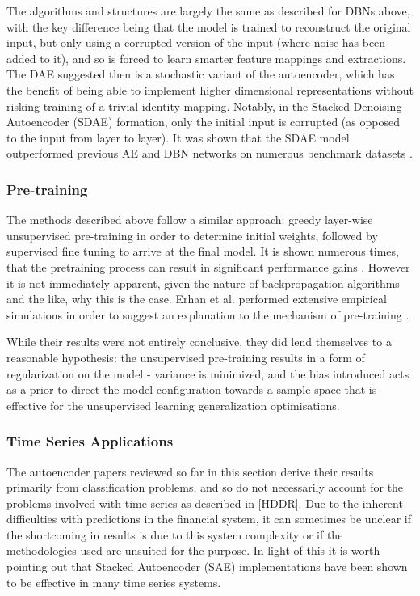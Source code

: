 \documentclass[a4paper,11pt,oneside]{article}
\theoremstyle{plain}
\theoremstyle{definition}
\begin{document}
	The algorithms and structures are largely the same as described for DBNs above, with the key difference 
	being that the model is trained to reconstruct the original input, but only using a corrupted version of the input 
	(where noise has been added to it), and so is forced to learn smarter feature mappings and extractions. 
	The DAE suggested then is a stochastic variant of the autoencoder, which has the benefit of being able to 
	implement higher dimensional representations without risking training of a trivial identity mapping. Notably, 
	in the Stacked Denoising Autoencoder (SDAE) formation, only the initial input is corrupted (as opposed to the 
	input from layer to layer). It was shown that the SDAE model outperformed previous AE and DBN networks on 
	numerous benchmark datasets \cite{Vincent} . 
	
	\subsubsection{Pre-training}
	
	The methods described above follow a similar approach: greedy layer-wise unsupervised pre-training in order to 
	determine initial weights, followed by supervised fine tuning to arrive at the final model. It is shown numerous times, 
	that the pretraining process can result in significant performance gains \cite{Vincent}. However it is not immediately apparent, 
	given the nature of backpropagation algorithms and the like, why this is the case. Erhan et al. performed 
	extensive empirical simulations in order to suggest an explanation to the mechanism of pre-training \cite{Erhan}.
	\hfill \break 
	
	While their results were not entirely conclusive, they did lend themselves to a reasonable hypothesis: 
	the unsupervised pre-training results in a form of regularization on the model - variance is minimized, and the 
	bias introduced acts as a prior to direct the model configuration towards a sample space that is effective for the unsupervised 
	learning generalization optimisations.
	
	\subsubsection{Time Series Applications}
	
	The autoencoder papers reviewed so far in this section derive their results primarily from classification problems, 
	and so do not necessarily account for the problems involved with time series as described in \ref{HDDR}. Due to 
	the inherent difficulties with predictions in the financial system, it can sometimes be unclear if the shortcoming in 
	results is due to this system complexity or if the methodologies used are unsuited for the purpose. In light of this 
	it is worth pointing out that Stacked Autoencoder (SAE) implementations have been shown to be effective in many
	time series systems.  
	\hfill \break 
	
\end{document}
